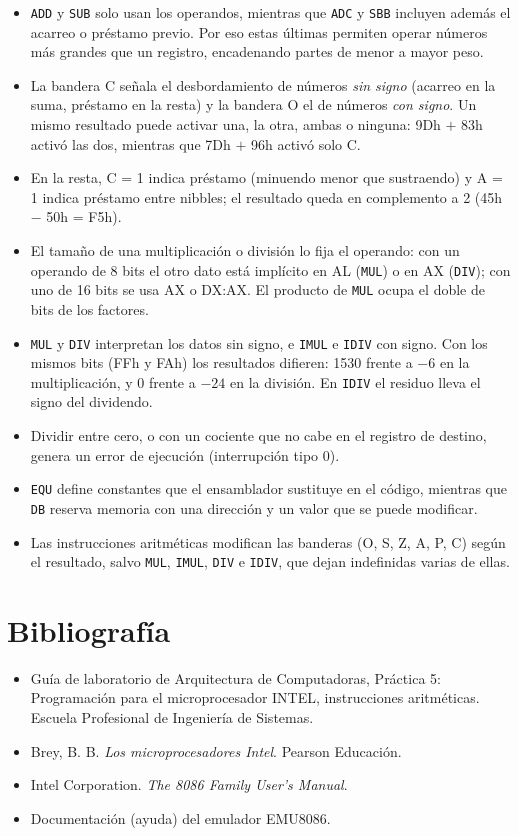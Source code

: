\documentclass[10pt]{article}
\begin{document}
\begin{itemize}
  \item \texttt{ADD} y \texttt{SUB} solo usan los operandos, mientras que \texttt{ADC} y \texttt{SBB} incluyen además el acarreo o préstamo previo. Por eso estas últimas permiten operar números más grandes que un registro, encadenando partes de menor a mayor peso.
  \item La bandera C señala el desbordamiento de números \emph{sin signo} (acarreo en la suma, préstamo en la resta) y la bandera O el de números \emph{con signo}. Un mismo resultado puede activar una, la otra, ambas o ninguna: 9Dh $+$ 83h activó las dos, mientras que 7Dh $+$ 96h activó solo C.
  \item En la resta, C = 1 indica préstamo (minuendo menor que sustraendo) y A = 1 indica préstamo entre nibbles; el resultado queda en complemento a 2 (45h $-$ 50h = F5h).
  \item El tamaño de una multiplicación o división lo fija el operando: con un operando de 8 bits el otro dato está implícito en AL (\texttt{MUL}) o en AX (\texttt{DIV}); con uno de 16 bits se usa AX o DX:AX. El producto de \texttt{MUL} ocupa el doble de bits de los factores.
  \item \texttt{MUL} y \texttt{DIV} interpretan los datos sin signo, e \texttt{IMUL} e \texttt{IDIV} con signo. Con los mismos bits (FFh y FAh) los resultados difieren: 1530 frente a $-6$ en la multiplicación, y 0 frente a $-24$ en la división. En \texttt{IDIV} el residuo lleva el signo del dividendo.
  \item Dividir entre cero, o con un cociente que no cabe en el registro de destino, genera un error de ejecución (interrupción tipo 0).
  \item \texttt{EQU} define constantes que el ensamblador sustituye en el código, mientras que \texttt{DB} reserva memoria con una dirección y un valor que se puede modificar.
  \item Las instrucciones aritméticas modifican las banderas (O, S, Z, A, P, C) según el resultado, salvo \texttt{MUL}, \texttt{IMUL}, \texttt{DIV} e \texttt{IDIV}, que dejan indefinidas varias de ellas.
\end{itemize}
 
\section{Bibliografía}
 
\begin{itemize}
  \item Guía de laboratorio de Arquitectura de Computadoras, Práctica 5: Programación para el microprocesador INTEL, instrucciones aritméticas. Escuela Profesional de Ingeniería de Sistemas.
  \item Brey, B. B. \emph{Los microprocesadores Intel}. Pearson Educación.
  \item Intel Corporation. \emph{The 8086 Family User's Manual}.
  \item Documentación (ayuda) del emulador EMU8086.
\end{itemize}
\end{document}
